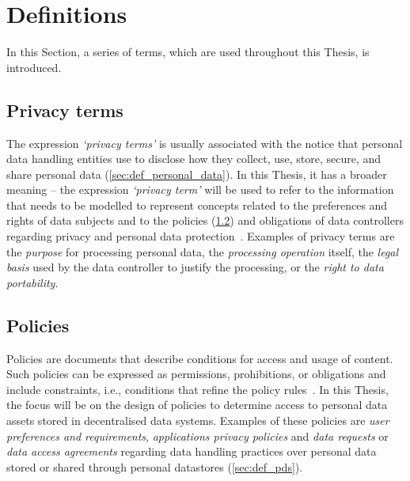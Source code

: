 \section{Definitions}
\label{sec:definitions}

In this Section, a series of terms, which are used throughout this Thesis, is introduced.

\subsection{Privacy terms}
\label{sec:def_privacy_terms}

The expression \textit{`privacy terms'} is usually associated with the notice that personal data handling entities use to disclose how they collect, use, store, secure, and share personal data (\ref{sec:def_personal_data}).
In this Thesis, it has a broader meaning -- the expression \textit{`privacy term'} will be used to refer to the information that needs to be modelled to represent concepts related to the preferences and rights of data subjects and to the policies (\ref{sec:def_policies}) and obligations of data controllers regarding privacy and personal data protection~\citep{esteves_challenges_2021}.
Examples of privacy terms are the \textit{purpose} for processing personal data, the \textit{processing operation} itself, the \textit{legal basis} used by the data controller to justify the processing, or the \textit{right to data portability}.

\subsection{Policies}
\label{sec:def_policies}

Policies are documents that describe conditions for access and usage of content. Such policies can be expressed as permissions, prohibitions, or obligations and include constraints, i.e., conditions that refine the policy rules~\citep{iannella_odrl_2018}.
In this Thesis, the focus will be on the design of policies to determine access to personal data assets stored in decentralised data systems. Examples of these policies are \textit{user preferences and requirements}, \textit{applications privacy policies} and \textit{data requests} or \textit{data access agreements} regarding data handling practices over personal data stored or shared through personal datastores (\ref{sec:def_pds}).

